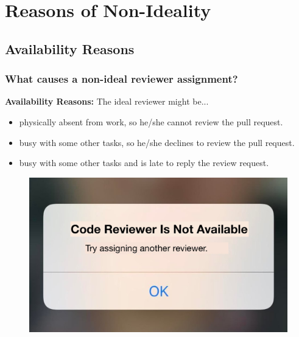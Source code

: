 \documentclass{beamer}
\begin{document}
\section{Reasons of Non-Ideality}
\subsection{Availability Reasons}
\begin{frame}
\frametitle{\large What causes a non-ideal reviewer assignment?}
    \textbf{Availability Reasons:} \newline
    The ideal reviewer might be...
    \begin{itemize}
        \item  physically absent from work, so he/she cannot review the pull request. 
    \item  busy with some other tasks, so he/she declines to review the pull request.
    \item busy with some other tasks and is late to reply the review request.
    \end{itemize}
      \begin{figure}
      \includegraphics[scale=0.1]{img/reviewer_available.jpg}
      \end{figure}

\end{frame}

\end{document}
